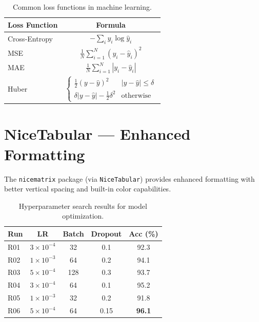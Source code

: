 \documentclass[
    language=english,
    doctype=article,
    institution=none,
]{../../omnilatex}
\begin{document}
\begin{table}[htbp]
    \centering
    \caption{Common loss functions in machine learning.}
    \label{tab:array-math}
    \renewcommand{\arraystretch}{1.6}
    \begin{tabular}{lc}
        \toprule
        \textbf{Loss Function} & \textbf{Formula} \\
        \midrule
        Cross-Entropy  & $-\sum_{i} y_i \log \hat{y}_i$ \\
        MSE            & $\frac{1}{N} \sum_{i=1}^{N} (y_i - \hat{y}_i)^2$ \\
        MAE            & $\frac{1}{N} \sum_{i=1}^{N} |y_i - \hat{y}_i|$ \\
        Huber          & $\begin{cases} \frac{1}{2}(y - \hat{y})^2 & |y - \hat{y}| \leq \delta \\ \delta|y - \hat{y}| - \frac{1}{2}\delta^2 & \text{otherwise} \end{cases}$ \\
        \bottomrule
    \end{tabular}
\end{table}

\section{NiceTabular — Enhanced Formatting}
\label{sec:nicetabular}

The \texttt{nicematrix} package (via \texttt{NiceTabular}) provides enhanced
formatting with better vertical spacing and built-in color capabilities.

\begin{table}[htbp]
    \centering
    \caption{Hyperparameter search results for model optimization.}
    \label{tab:nicetabular}
    \renewcommand{\arraystretch}{1.3}
    \begin{tabular}{l c c c c}
        \toprule
        \textbf{Run} & \textbf{LR} & \textbf{Batch} & \textbf{Dropout} & \textbf{Acc (\%)} \\
        \midrule
        R01 & $3 \times 10^{-4}$ & 32  & 0.1 & 92.3 \\
        R02 & $1 \times 10^{-3}$ & 64  & 0.2 & 94.1 \\
        R03 & $5 \times 10^{-4}$ & 128 & 0.3 & 93.7 \\
        R04 & $3 \times 10^{-4}$ & 64  & 0.1 & 95.2 \\
        R05 & $1 \times 10^{-3}$ & 32  & 0.2 & 91.8 \\
        R06 & $5 \times 10^{-4}$ & 64  & 0.15 & \textbf{96.1} \\
        \bottomrule
    \end{tabular}
\end{table}
\end{document}
